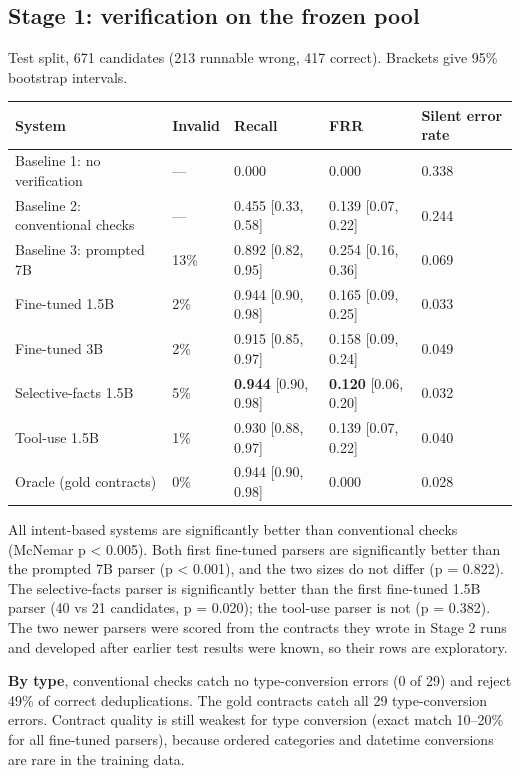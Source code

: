 \documentclass[11pt]{article}
\begin{document}
\subsection{Stage 1: verification on the frozen pool}

Test split, 671 candidates (213 runnable wrong, 417 correct). Brackets
give 95\% bootstrap intervals.

\begin{table}[!tp]
\centering\footnotesize\setlength{\tabcolsep}{3pt}\renewcommand{\arraystretch}{1.1}
\begin{tabularx}{\textwidth}{>{\raggedright\arraybackslash}Xllll}
\toprule
\textbf{System} & \textbf{Invalid} & \textbf{Recall} & \textbf{FRR} & \textbf{Silent error rate} \\
\midrule
Baseline 1: no verification & — & 0.000 & 0.000 & 0.338 \\
Baseline 2: conventional checks & — & 0.455 [0.33, 0.58] & 0.139 [0.07, 0.22] & 0.244 \\
Baseline 3: prompted 7B & 13\% & 0.892 [0.82, 0.95] & 0.254 [0.16, 0.36] & 0.069 \\
Fine-tuned 1.5B & 2\% & 0.944 [0.90, 0.98] & 0.165 [0.09, 0.25] & 0.033 \\
Fine-tuned 3B & 2\% & 0.915 [0.85, 0.97] & 0.158 [0.09, 0.24] & 0.049 \\
Selective-facts 1.5B & 5\% & \textbf{0.944} [0.90, 0.98] & \textbf{0.120} [0.06, 0.20] & 0.032 \\
Tool-use 1.5B & 1\% & 0.930 [0.88, 0.97] & 0.139 [0.07, 0.22] & 0.040 \\
Oracle (gold contracts) & 0\% & 0.944 [0.90, 0.98] & 0.000 & 0.028 \\
\bottomrule
\end{tabularx}
\end{table}

All intent-based systems are significantly better than conventional
checks (McNemar p \textless{} 0.005). Both first fine-tuned parsers are
significantly better than the prompted 7B parser (p \textless{} 0.001),
and the two sizes do not differ (p = 0.822). The selective-facts parser
is significantly better than the first fine-tuned 1.5B parser (40 vs 21
candidates, p = 0.020); the tool-use parser is not (p = 0.382). The two
newer parsers were scored from the contracts they wrote in Stage 2 runs
and developed after earlier test results were known, so their rows are
exploratory.

\textbf{By type}, conventional checks catch no type-conversion errors (0
of 29) and reject 49\% of correct deduplications. The gold contracts
catch all 29 type-conversion errors. Contract quality is still weakest
for type conversion (exact match 10--20\% for all fine-tuned parsers),
because ordered categories and datetime conversions are rare in the
training data.
\end{document}
